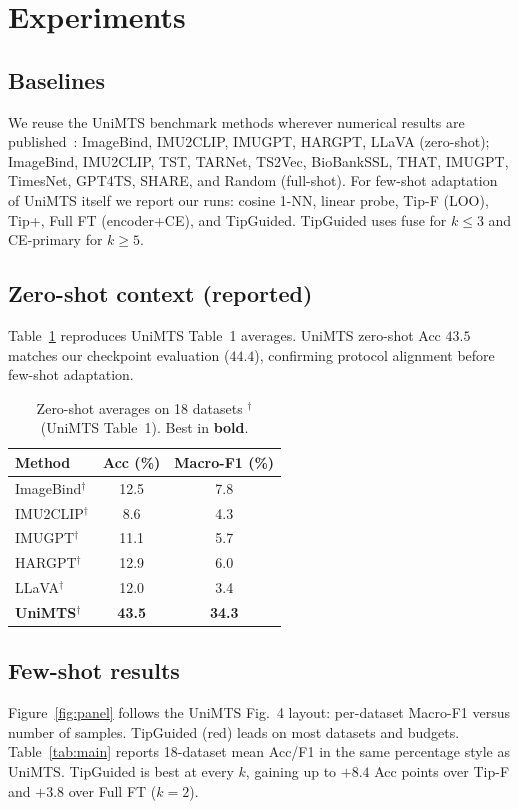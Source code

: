 \documentclass[11pt]{article}
\begin{document}
\section{Experiments}
\label{sec:exp}

\subsection{Baselines}
We reuse the UniMTS benchmark methods wherever numerical results are published~\cite{unimts}:
ImageBind, IMU2CLIP, IMUGPT, HARGPT, LLaVA (zero-shot);
ImageBind, IMU2CLIP, TST, TARNet, TS2Vec, BioBankSSL, THAT, IMUGPT, TimesNet, GPT4TS, SHARE, and Random (full-shot).
For few-shot adaptation of UniMTS itself we report our runs:
cosine 1-NN, linear probe, Tip-F (LOO), Tip+, Full FT (encoder{+}CE), and TipGuided.
TipGuided uses fuse for \(k\le3\) and CE-primary for \(k\ge5\).

\subsection{Zero-shot context (reported)}
Table~\ref{tab:zs-reported} reproduces UniMTS Table~1 averages.
UniMTS zero-shot Acc \(43.5\) matches our checkpoint evaluation (\(44.4\)), confirming protocol alignment before few-shot adaptation.

\begin{table}[t]
\centering
\caption{Zero-shot averages on 18 datasets $^\dagger$ (UniMTS Table~1).
Best in \textbf{bold}.}
\label{tab:zs-reported}
\small
\begin{tabular}{lcc}
\toprule
Method & Acc (\%) & Macro-F1 (\%) \\
\midrule
ImageBind$^\dagger$ & 12.5 & 7.8 \\
IMU2CLIP$^\dagger$ & 8.6 & 4.3 \\
IMUGPT$^\dagger$ & 11.1 & 5.7 \\
HARGPT$^\dagger$ & 12.9 & 6.0 \\
LLaVA$^\dagger$ & 12.0 & 3.4 \\
\textbf{UniMTS}$^\dagger$ & \textbf{43.5} & \textbf{34.3} \\
\bottomrule
\end{tabular}
\end{table}

\subsection{Few-shot results}
Figure~\ref{fig:panel} follows the UniMTS Fig.~4 layout: per-dataset Macro-F1 versus number of samples.
TipGuided (red) leads on most datasets and budgets.
Table~\ref{tab:main} reports 18-dataset mean Acc/F1 in the same percentage style as UniMTS.
TipGuided is best at every \(k\), gaining up to \(+8.4\) Acc points over Tip-F and \(+3.8\) over Full FT (\(k{=}2\)).
\end{document}
